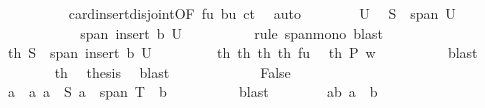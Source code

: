 \begin{isabellebody}
\ \ \ \ \ \ \ \ \isamarkupfalse%
\ card{\isacharunderscore}{\kern0pt}insert{\isacharunderscore}{\kern0pt}disjoint{\isacharbrackleft}{\kern0pt}OF\ fu\ bu{\isacharbrackright}{\kern0pt}\ ct{}\ \isamarkupfalse%
\ auto\isanewline
\ \ \ \ \ \ \isamarkupfalse%
\ U{\isacharparenleft}{\kern0pt}{}{\isacharparenright}{\kern0pt}\ \isamarkupfalse%
\ {\isachardoublequoteopen}S\ {\isasymsubseteq}\ span\ U{\isachardoublequoteclose}\ \isacommand{{\isachardot}{\kern0pt}}\isamarkupfalse%
\isanewline
\ \ \ \ \ \ \isamarkupfalse%
\ \isamarkupfalse%
\ {\isachardoublequoteopen}{\isasymdots}\ {\isasymsubseteq}\ span\ {\isacharparenleft}{\kern0pt}insert\ b\ U{\isacharparenright}{\kern0pt}{\isachardoublequoteclose}\isanewline
\ \ \ \ \ \ \ \ \isamarkupfalse%
\ {\isacharparenleft}{\kern0pt}rule\ span{\isacharunderscore}{\kern0pt}mono{\isacharparenright}{\kern0pt}\ blast\isanewline
\ \ \ \ \ \ \isamarkupfalse%
\ \isamarkupfalse%
\ th{}{\isacharcolon}{\kern0pt}\ {\isachardoublequoteopen}S\ {\isasymsubseteq}\ span\ {\isacharparenleft}{\kern0pt}insert\ b\ U{\isacharparenright}{\kern0pt}{\isachardoublequoteclose}\ \isacommand{{\isachardot}{\kern0pt}}\isamarkupfalse%
\isanewline
\ \ \ \ \ \ \isamarkupfalse%
\ th{}\ th{}\ th{}\ th{}\ fu\ \isamarkupfalse%
\ th{\isacharcolon}{\kern0pt}\ {\isachardoublequoteopen}{\isacharquery}{\kern0pt}P\ {\isacharquery}{\kern0pt}w{\isachardoublequoteclose}\isanewline
\ \ \ \ \ \ \ \ \isamarkupfalse%
\ blast\isanewline
\ \ \ \ \ \ \isamarkupfalse%
\ th\ \isamarkupfalse%
\ {\isacharquery}{\kern0pt}thesis\ \isamarkupfalse%
\ blast\isanewline
\ \ \ \ \isamarkupfalse%
\isanewline
\ \ \ \ \ \ \isamarkupfalse%
\ False\isanewline
\ \ \ \ \ \ \isamarkupfalse%
\ \isamarkupfalse%
\ a\ \ a{\isacharcolon}{\kern0pt}\ {\isachardoublequoteopen}a\ {\isasymin}\ S{\isachardoublequoteclose}\ {\isachardoublequoteopen}a\ {\isasymnotin}\ span\ {\isacharparenleft}{\kern0pt}T\ {\isacharminus}{\kern0pt}\ {\isacharbraceleft}{\kern0pt}b{\isacharbraceright}{\kern0pt}{\isacharparenright}{\kern0pt}{\isachardoublequoteclose}\isanewline
\ \ \ \ \ \ \ \ \isamarkupfalse%
\ blast\isanewline
\ \ \ \ \ \ \isamarkupfalse%
\ ab{\isacharcolon}{\kern0pt}\ {\isachardoublequoteopen}a\ {\isasymnoteq}\ b{\isachardoublequoteclose}\isanewline

\end{isabellebody}
